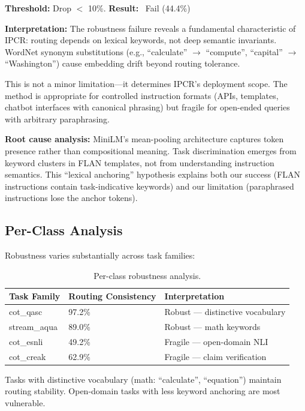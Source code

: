 \textbf{Threshold:} Drop $<$ 10\%. \textbf{Result:} \xmark~Fail (44.4\%)

\textbf{Interpretation:} The robustness failure reveals a fundamental characteristic of IPCR: routing depends on lexical keywords, not deep semantic invariants. WordNet synonym substitutions (e.g., ``calculate'' $\rightarrow$ ``compute'', ``capital'' $\rightarrow$ ``Washington'') cause embedding drift beyond routing tolerance.

This is not a minor limitation---it determines IPCR's deployment scope. The method is appropriate for controlled instruction formats (APIs, templates, chatbot interfaces with canonical phrasing) but fragile for open-ended queries with arbitrary paraphrasing.

\textbf{Root cause analysis:} MiniLM's mean-pooling architecture captures token presence rather than compositional meaning. Task discrimination emerges from keyword clusters in FLAN templates, not from understanding instruction semantics. This ``lexical anchoring'' hypothesis explains both our success (FLAN instructions contain task-indicative keywords) and our limitation (paraphrased instructions lose the anchor tokens).

\subsection{Per-Class Analysis}

Robustness varies substantially across task families:

\begin{table}[h]
\centering
\begin{tabular}{lll}
\toprule
\textbf{Task Family} & \textbf{Routing Consistency} & \textbf{Interpretation} \\
\midrule
cot\_qasc & 97.2\% & Robust --- distinctive vocabulary \\
stream\_aqua & 89.0\% & Robust --- math keywords \\
cot\_esnli & 49.2\% & Fragile --- open-domain NLI \\
cot\_creak & 62.9\% & Fragile --- claim verification \\
\bottomrule
\end{tabular}
\caption{Per-class robustness analysis.}
\label{tab:perclass}
\end{table}

Tasks with distinctive vocabulary (math: ``calculate'', ``equation'') maintain routing stability. Open-domain tasks with less keyword anchoring are most vulnerable.
